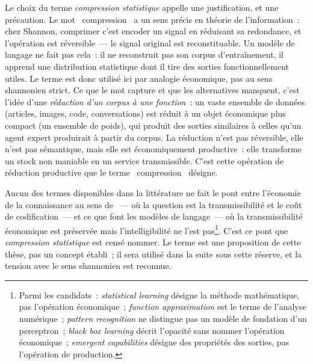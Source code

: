 Le choix du terme \emph{compression statistique} appelle une justification, et une précaution. Le mot \og~compression~\fg{} a un sens précis en théorie de l'information~: chez Shannon, comprimer c'est encoder un signal en réduisant sa redondance, et l'opération est réversible~--- le signal original est reconstituable. Un modèle de langage ne fait pas cela~: il ne reconstruit pas son corpus d'entraînement, il apprend une distribution statistique dont il tire des sorties fonctionnellement utiles. Le terme est donc utilisé ici par analogie économique, pas au sens shannonien strict. Ce que le mot capture et que les alternatives manquent, c'est l'idée d'une \emph{réduction d'un corpus à une fonction}~: un vaste ensemble de données (articles, images, code, conversations) est réduit à un objet économique plus compact (un ensemble de poids), qui produit des sorties similaires à celles qu'un agent expert produirait à partir du corpus. La réduction n'est pas réversible, elle n'est pas sémantique, mais elle est économiquement productive~: elle transforme un stock non maniable en un service transmissible. C'est cette opération de réduction productive que le terme \og~compression~\fg{} désigne.

Aucun des termes disponibles dans la littérature ne fait le pont entre l'économie de la connaissance au sens de \textcite{cowan_explicit_2000}~--- où la question est la transmissibilité et le coût de codification~--- et ce que font les modèles de langage~--- où la transmissibilité économique est préservée mais l'intelligibilité ne l'est pas\footnote{Parmi les candidats~: \emph{statistical learning} \parencite{hastie_elements_2009} désigne la méthode mathématique, pas l'opération économique~; \emph{function approximation} est le terme de l'analyse numérique~; \emph{pattern recognition} ne distingue pas un modèle de fondation d'un perceptron~; \emph{black box learning} \parencite{marcus_2024} décrit l'opacité sans nommer l'opération économique~; \emph{emergent capabilities} \parencite{wei_emergent_2022} désigne des propriétés des sorties, pas l'opération de production.}. C'est ce pont que \emph{compression statistique} est censé nommer. Le terme est une proposition de cette thèse, pas un concept établi~; il sera utilisé dans la suite sous cette réserve, et la tension avec le sens shannonien est reconnue.

